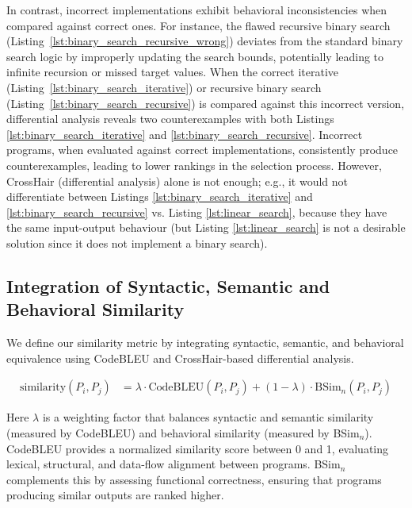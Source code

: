 \documentclass{article}
\begin{document}
In contrast, incorrect implementations exhibit behavioral inconsistencies when compared against correct ones. For instance, the flawed recursive binary search (Listing~\ref{lst:binary_search_recursive_wrong}) deviates from the standard binary search logic by improperly updating the search bounds, potentially leading to infinite recursion or missed target values. When the correct iterative (Listing~\ref{lst:binary_search_iterative}) or recursive binary search (Listing~\ref{lst:binary_search_recursive}) is compared against this incorrect version, differential analysis reveals two counterexamples with both Listings \ref{lst:binary_search_iterative} and \ref{lst:binary_search_recursive}. Incorrect programs, when evaluated against correct implementations, consistently produce counterexamples, leading to lower rankings in the selection process. However, CrossHair (differential analysis) alone is not enough; e.g., it would not differentiate between Listings \ref{lst:binary_search_iterative} and \ref{lst:binary_search_recursive} vs. Listing \ref{lst:linear_search}, because they have the same input-output behaviour (but Listing \ref{lst:linear_search} is not a desirable solution since it does not implement a binary search).


\subsection{Integration of Syntactic, Semantic and Behavioral Similarity}

We define our similarity metric by integrating syntactic, semantic, and behavioral equivalence using CodeBLEU and CrossHair-based differential analysis.

\begin{equation}
\label{eq:similarity}
\begin{split}
   \text{similarity}(P_i, P_j) &= \lambda \cdot \text{CodeBLEU}(P_i, P_j) + (1 - \lambda) \cdot \text{BSim}_n(P_i, P_j)
\end{split}
\end{equation}

\noindent Here \( \lambda \) is a weighting factor that balances syntactic and semantic similarity (measured by CodeBLEU) and behavioral similarity (measured by BSim\(_n\)). CodeBLEU provides a normalized similarity score between 0 and 1, evaluating lexical, structural, and data-flow alignment between programs. BSim\(_n\) complements this by assessing functional correctness, ensuring that programs producing similar outputs are ranked higher.
\end{document}
